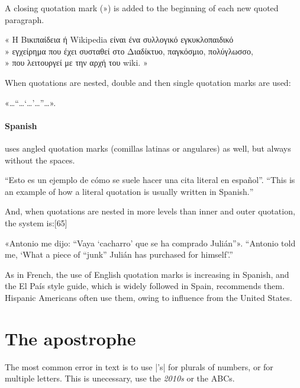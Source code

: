 A closing quotation mark (») is added to the beginning of each new quoted paragraph.

\begin{scriptexample}[\panunicode]{}
« Η Βικιπαίδεια ή Wikipedia είναι ένα συλλογικό εγκυκλοπαιδικό\\
» εγχείρημα που έχει συσταθεί στο Διαδίκτυο, παγκόσμιο, πολύγλωσσο,\\
» που λειτουργεί με την αρχή του wiki. »
\end{scriptexample}

When quotations are nested, double and then single quotation marks are used:

«\ldots“\ldots‘\ldots’\ldots”\ldots».

\paragraph{Spanish} uses angled quotation marks (comillas latinas or angulares) as well, but always without the spaces.

\begin{scriptexample}[\panunicode]{}
\enquote{Esto es un ejemplo de cómo se suele hacer una cita literal en español}. 
\foreignquote{english}{This is an example of how a literal quotation is usually written in Spanish.}
\end{scriptexample}

And, when quotations are nested in more levels than inner and outer quotation, the system is:[65]

\begin{scriptexample}[\panunicode]{}
«Antonio me dijo: “Vaya ‘cacharro’ que se ha comprado Julián”».
“Antonio told me, ‘What a piece of “junk” Julián has purchased for himself’.”
\end{scriptexample}

As in French, the use of English quotation marks is increasing in Spanish, and the El País style guide, which is widely followed in Spain, recommends them. Hispanic Americans often use them, owing to influence from the United States.

\section{The apostrophe}

The most common error in text is to use |'s| for plurals of numbers, or for multiple letters. This is unecessary, use the \emph{2010s} or the ABCs.

